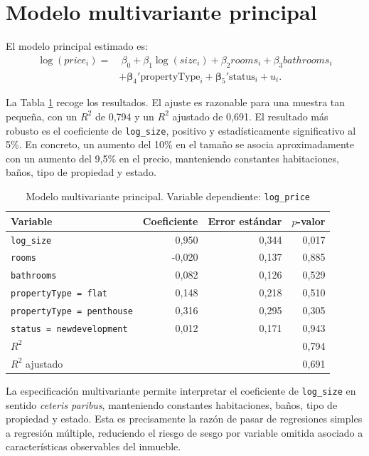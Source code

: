 \documentclass[11pt,a4paper]{article}
\begin{document}
\section{Modelo multivariante principal}

El modelo principal estimado es:
\[
\begin{aligned}
\log(price_i)=&\ \beta_0+\beta_1\log(size_i)+\beta_2 rooms_i+\beta_3 bathrooms_i\\
&+\boldsymbol{\beta}_4'\mathrm{propertyType}_i+\boldsymbol{\beta}_5'\mathrm{status}_i+u_i.
\end{aligned}
\]

La Tabla \ref{tab:principal} recoge los resultados. El ajuste es razonable para una muestra tan pequeña, con un $R^2$ de 0,794 y un $R^2$ ajustado de 0,691. El resultado más robusto es el coeficiente de \texttt{log\_size}, positivo y estadísticamente significativo al 5\%. En concreto, un aumento del 10\% en el tamaño se asocia aproximadamente con un aumento del 9,5\% en el precio, manteniendo constantes habitaciones, baños, tipo de propiedad y estado.

\begin{table}[H]
\centering
\caption{Modelo multivariante principal. Variable dependiente: \texttt{log\_price}}
\label{tab:principal}
\small
{}
\begin{tabular}{p{4.7cm}rrr}
\toprule
\rowcolor{tablehead}
Variable & Coeficiente & Error estándar & $p$-valor \\
\midrule
\texttt{log\_size} & 0,950 & 0,344 & 0,017 \\
\texttt{rooms} & -0,020 & 0,137 & 0,885 \\
\texttt{bathrooms} & 0,082 & 0,126 & 0,529 \\
\texttt{propertyType = flat} & 0,148 & 0,218 & 0,510 \\
\texttt{propertyType = penthouse} & 0,316 & 0,295 & 0,305 \\
\texttt{status = newdevelopment} & 0,012 & 0,171 & 0,943 \\
\midrule
$R^2$ & \multicolumn{3}{r}{0,794} \\
$R^2$ ajustado & \multicolumn{3}{r}{0,691} \\
\bottomrule
\end{tabular}
\end{table}

La especificación multivariante permite interpretar el coeficiente de \texttt{log\_size} en sentido \textit{ceteris paribus}, manteniendo constantes habitaciones, baños, tipo de propiedad y estado. Esta es precisamente la razón de pasar de regresiones simples a regresión múltiple, reduciendo el riesgo de sesgo por variable omitida asociado a características observables del inmueble.
\end{document}
